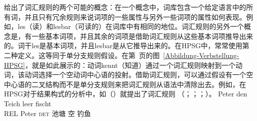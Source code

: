 \citet{Jackendoff75a}给出了词汇规则的两个可能的概念：在一个概念中，词库包含一个给定语言中的所有词，并且只有冗余规则来说词项的一些属性与另外一些词项的属性如何表现。例如，les（读）和lesbar（可读的）在词库中有相同的地位。词汇规则的另外一个概念是，有一些基本词项，并且其余的词项是借助词汇规则从这些基本词项推导出来的。词干les是基本词项，并且lesbar是从它推导出来的。在HPSG中，常常使用第二种定义。这等同于单分支规则假设。在第~\pageref{Abbildung-Verbstellung-HPSG}页的图~\ref{Abbildung-Verbstellung-HPSG}，就是如此展示的：动词kennt（知道）通过一个词汇规则映射到一个动词，该动词选择一个空动词中心语的投射。借助词汇规则，可以通过假设有一个空中心语的二叉结构而不是单分支规则来把词汇规则从语法中清除出去。例如，在HPSG对于结果构式的分析中，如（）就提出了词汇规则 （\citealp{Verspoor97a}；\citealp{Wechsler97a}；\citealp{WN2001a}；\citealp[\S~5]{Mueller2002b}）。
\ea
\gll [dass] Peter den Teich leer fischt\\
	 \spacebr{}REL Peter \textsc{det} 池塘 空 钓鱼\\
